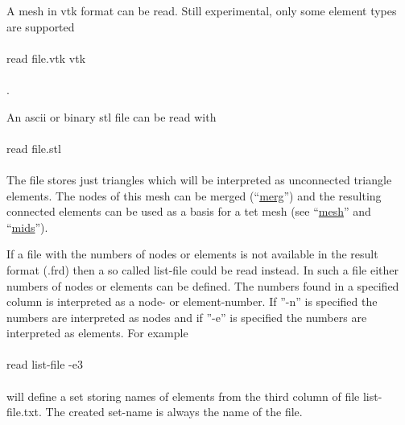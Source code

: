 \documentclass{article}
\providecommand{\htmlref}[2]{\hyperref[#2]{#1}}
\begin{document}
A mesh in vtk format can be read. Still experimental, only some element types are supported\\\\read file.vtk vtk\\\\.

An ascii or binary stl file can be read with \\\\read file.stl\\\\ The file stores just triangles which will be interpreted as unconnected triangle elements. The nodes of this mesh can be merged (``\htmlref{merg}{merg}'') and the resulting connected elements can be used as a basis for a tet mesh (see ``\htmlref{mesh}{mesh}'' and ``\htmlref{mids}{mids}'').

If a file with the numbers of nodes or elements is not available in the result format (.frd) then a so called list-file could be read instead. In such a file either numbers of nodes or elements can be defined. The numbers found in a specified column is interpreted as a node- or element-number. If ''-n'' is specified the numbers are interpreted as nodes and if ''-e'' is specified the numbers are interpreted as elements. For example\\\\read list-file -e3\\\\will define a set storing names of elements from the third column of file list-file.txt. The created set-name is always the name of the file.\\\\
\end{document}
